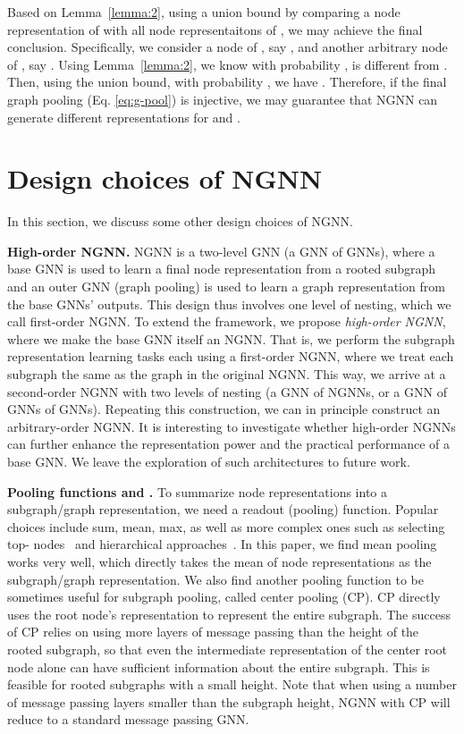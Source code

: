 \documentclass{article}
\begin{document}
Based on Lemma~\ref{lemma:2}, using a union bound by comparing a node representation of  with all node representaitons of , we may achieve the final conclusion. Specifically, we consider a node of , say , and another arbitrary node of , say . Using Lemma~\ref{lemma:2}, we know with probability ,  is different from . Then, using the union bound, with probability , we have . Therefore, if the final graph pooling (Eq. \ref{eq:g-pool}) is injective, we may guarantee that NGNN can generate different representations for  and .


\section{Design choices of NGNN}\label{appendix:design_choices}

In this section, we discuss some other design choices of NGNN.

\textbf{High-order NGNN.} 
NGNN is a two-level GNN (a GNN of GNNs), where a base GNN is used to learn a final node representation from a rooted subgraph and an outer GNN (graph pooling) is used to learn a graph representation from the base GNNs' outputs. This design thus involves one level of nesting, which we call first-order NGNN. To extend the framework, we propose \textit{high-order NGNN}, where we make the base GNN itself an NGNN. That is, we perform the subgraph representation learning tasks each using a first-order NGNN, where we treat each subgraph the same as the graph in the original NGNN. This way, we arrive at a second-order NGNN with two levels of nesting (a GNN of NGNNs, or a GNN of GNNs of GNNs). Repeating this construction, we can in principle construct an arbitrary-order NGNN. It is interesting to investigate whether high-order NGNNs can further enhance the representation power and the practical performance of a base GNN. We leave the exploration of such architectures to future work.

\textbf{Pooling functions  and .} 
To summarize node representations into a subgraph/graph representation, we need a readout (pooling) function. Popular choices include sum, mean, max, as well as more complex ones such as selecting top- nodes~\citep{zhang2018end,gao2019graph} and hierarchical approaches~\citep{ying2018hierarchical}. In this paper, we find mean pooling works very well, which directly takes the mean of node representations as the subgraph/graph representation. We also find another pooling function to be sometimes useful for subgraph pooling, called center pooling (CP). CP directly uses the root node's representation to represent the entire subgraph. The success of CP relies on using more layers of message passing than the height of the rooted subgraph, so that even the intermediate representation of the center root node alone can have sufficient information about the entire subgraph. This is feasible for rooted subgraphs with a small height. Note that when using a number of message passing layers smaller than the subgraph height, NGNN with CP will reduce to a standard message passing GNN.
\end{document}
